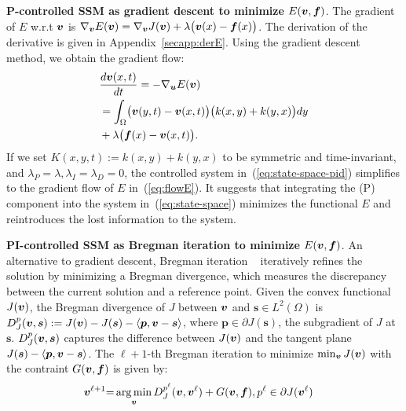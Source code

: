\textbf{P-controlled SSM as gradient descent to minimize $E({\bm v}, {\bm f})$}.
The gradient of $E$ w.r.t ${\bm v}$ is $\nabla_{{\bm v}}E({\bm v}) = \nabla_{{\bm v}}J({\bm v}) + \lambda \bigl({\bm v}(x) - {\bm f}(x)\bigl)$.
The derivation of the derivative is given in Appendix~\ref{secapp:derE}.
Using the gradient descent method, we obtain the gradient flow:
\\
\begin{equation}
\label{eq:flowE}
    \begin{aligned}
        &\frac{d{\bm v}(x,t)}{dt} = -\nabla_{\bm{u}}E({\bm v}) \\
        &= \int_{\Omega} \bigl(\bm{v}(y,t) - \bm{v}(x,t) \bigl)\bigl(k(x, y) + k(y,x)\bigl)dy \\
        &+ \lambda\bigl({\bm f}(x) - {\bm v}(x, t)\bigl).
    \end{aligned}
\end{equation}
If we set
$K(x, y, t) := k(x, y) + k(y, x)$ to be symmetric and time-invariant, and $\lambda_P = \lambda, \lambda_I = \lambda_D = 0$, the controlled system in~(\ref{eq:state-space-pid}) simplifies to the gradient flow of $E$ in~(\ref{eq:flowE}). It suggests that integrating the (P) component into the system in~(\ref{eq:state-space}) minimizes the functional $E$ and reintroduces the lost information to the system.

\textbf{PI-controlled SSM as Bregman iteration to minimize $E({\bm v}, {\bm f})$}.
%
An alternative to gradient descent, Bregman iteration ~\cite{stanbregman,zhangnonlocalbregman} iteratively refines the solution by minimizing a Bregman divergence, which measures the discrepancy between the current solution and a reference point.
Given the convex functional $J({\bm v})$, the Bregman divergence of $J$ between ${\bm v}$ and $\bm{s} \in L^{2}(\Omega)$ is $D_J^p({\bm v}, \bm{s}) := J({\bm v}) - J(\bm{s}) - 
\langle  \bm{p} , {\bm v} - \bm{s} \rangle $, where $\bm{p} \in \partial J(\bm{s})$, the subgradient of $J$ at $\bm{s}$. $D_J^p({\bm v}, \bm{s})$ captures the difference between $J({\bm v})$ and the tangent plane $J(\bm{s}) - \langle\bm{p} , {\bm v} - \bm{s}\rangle$.
The $\ell + 1$-th Bregman iteration to minimize $\min_{{\bm v}}J({\bm v})$ with the contraint $G({\bm v}, {\bm f})$ is given by:
\begin{align}\label{eqn:breg-op}
    {\bm v}^{\ell + 1} &{=} \operatorname*{arg\,min}_{{\bm v}} D_J^{p^{\ell}}({\bm v}, {\bm v}^{\ell}) + G({\bm v}, {\bm f}), p^{\ell} \in \partial J({\bm v}^{\ell})
\end{align}

